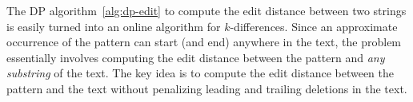 
The DP algorithm~\ref{alg:dp-edit} to compute the edit distance between two strings is easily turned into an online algorithm for $k$-differences.
Since an approximate occurrence of the pattern can start (and end) anywhere in the text, the problem essentially involves computing the edit distance between the pattern and \emph{any substring} of the text.
The key idea is to compute the edit distance between the pattern and the text without penalizing leading and trailing deletions in the text.


